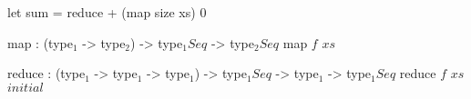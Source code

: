 \documentclass{slide}
\begin{document}
\begin{frame}[fragile]
\begin{code}[language=lambda]{}
let sum = reduce + (map size xs) 0
\end{code}
\end{frame}

\begin{frame}[fragile]
\large
\begin{defn}[$map$]
\begin{code}[language=lambda]{}
map : (type$_1$ -> type$_2$) -> type$_1 Seq$ -> type$_2 Seq$
map $f$ $xs$
\end{code}
\end{defn}
\end{frame}

\begin{frame}[fragile]
\large
\begin{defn}[$reduce$]
\begin{code}[language=lambda]{}
reduce : (type$_1$ -> type$_1$ -> type$_1$) -> type$_1 Seq$ -> type$_1$ -> type$_1 Seq$
reduce $f$ $xs$ $initial$
\end{code}
\end{defn}
\end{frame}



\end{document}
